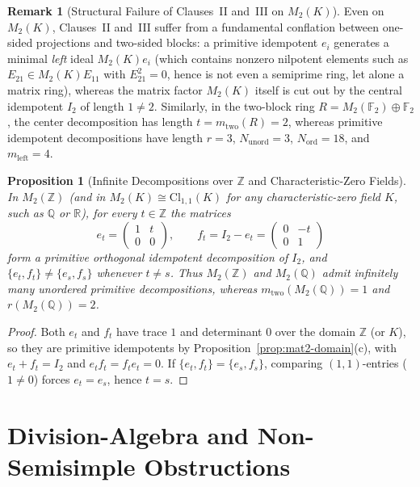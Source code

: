 \documentclass[11pt]{article}
\newtheorem{proposition}[theorem]{Proposition}
\theoremstyle{definition}
\newtheorem{remark}[theorem]{Remark}
\newcommand{\Cl}{\mathrm{Cl}}
\newcommand{\Mat}{M}
\newcommand{\F}{\mathbb{F}}
\newcommand{\Z}{\mathbb{Z}}
\newcommand{\Q}{\mathbb{Q}}
\newcommand{\R}{\mathbb{R}}
\begin{document}
\begin{remark}[Structural Failure of Clauses~II and~III on $\Mat_2(K)$]
Even on $\Mat_2(K)$, Clauses~II and~III suffer from a fundamental conflation
between one-sided projections and two-sided blocks: a primitive idempotent
$e_i$ generates a minimal \emph{left} ideal $\Mat_2(K)e_i$ (which contains
nonzero nilpotent elements such as $E_{21} \in \Mat_2(K)E_{11}$ with
$E_{21}^2 = 0$, hence is not even a semiprime ring, let alone a matrix ring),
whereas the matrix factor $\Mat_2(K)$ itself is cut out by the central
idempotent $I_2$ of length $1 \neq 2$. Similarly, in the two-block ring
$R = \Mat_2(\F_2) \oplus \F_2$, the center decomposition has length
$t = m_{\mathrm{two}}(R) = 2$, whereas primitive idempotent decompositions have
length $r = 3$, $N_{\mathrm{unord}} = 3$, $N_{\mathrm{ord}} = 18$, and
$m_{\mathrm{left}} = 4$.
\end{remark}

\begin{proposition}[Infinite Decompositions over $\Z$ and Characteristic-Zero Fields]
\label{prop:mat2-inf}
In $\Mat_2(\Z)$ (and in $\Mat_2(K) \cong \Cl_{1,1}(K)$ for any characteristic-zero
field $K$, such as $\Q$ or $\R$), for every $t \in \Z$ the matrices
\[
  e_t = \begin{pmatrix} 1 & t \\ 0 & 0 \end{pmatrix}, \qquad
  f_t = I_2 - e_t = \begin{pmatrix} 0 & -t \\ 0 & 1 \end{pmatrix}
\]
form a primitive orthogonal idempotent decomposition of $I_2$, and
$\{e_t, f_t\} \neq \{e_s, f_s\}$ whenever $t \neq s$. Thus $\Mat_2(\Z)$ and
$\Mat_2(\Q)$ admit infinitely many unordered primitive decompositions, whereas
$m_{\mathrm{two}}(\Mat_2(\Q)) = 1$ and $r(\Mat_2(\Q)) = 2$.
\end{proposition}

\begin{proof}
Both $e_t$ and $f_t$ have trace $1$ and determinant $0$ over the domain $\Z$
(or $K$), so they are primitive idempotents by Proposition~\ref{prop:mat2-domain}(c),
with $e_t + f_t = I_2$ and $e_t f_t = f_t e_t = 0$. If $\{e_t, f_t\} = \{e_s, f_s\}$,
comparing $(1,1)$-entries ($1 \neq 0$) forces $e_t = e_s$, hence $t = s$.
\end{proof}

\section{Division-Algebra and Non-Semisimple Obstructions}
\end{document}
